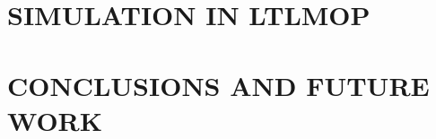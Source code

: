 \documentclass[letterpaper, 10 pt, conference]{ieeeconf}  %
\begin{document}
\section{SIMULATION IN LTLMOP}\label{simulation}  %

%
\section{CONCLUSIONS AND FUTURE WORK}\label{conclusion}

%

%
%
%
%
%
%


%
\end{document}
